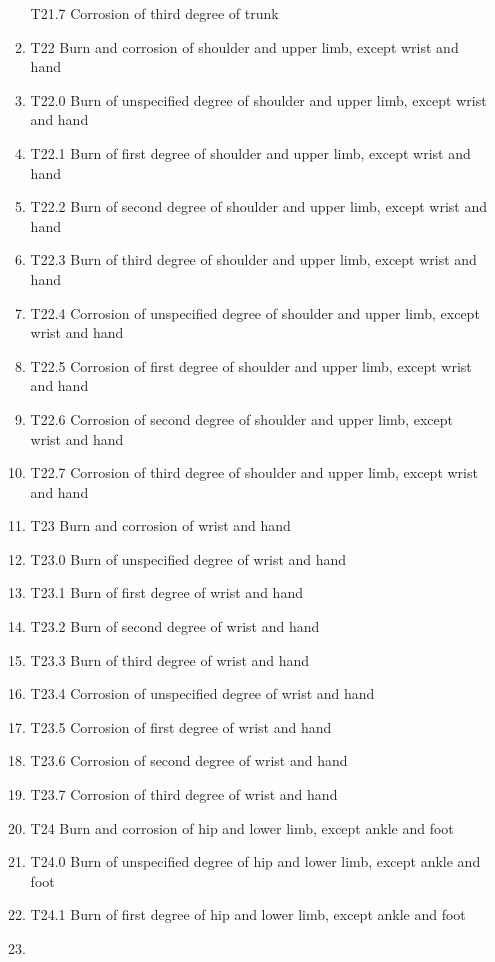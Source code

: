 \documentclass[
]{scrartcl}
\begin{document}
\begin{itemize}
\begin{enumerate}
    T21.7 Corrosion of third degree of trunk
  \item
    T22 Burn and corrosion of shoulder and upper limb, except wrist and
    hand
  \item
    T22.0 Burn of unspecified degree of shoulder and upper limb, except
    wrist and hand
  \item
    T22.1 Burn of first degree of shoulder and upper limb, except wrist
    and hand
  \item
    T22.2 Burn of second degree of shoulder and upper limb, except wrist
    and hand
  \item
    T22.3 Burn of third degree of shoulder and upper limb, except wrist
    and hand
  \item
    T22.4 Corrosion of unspecified degree of shoulder and upper limb,
    except wrist and hand
  \item
    T22.5 Corrosion of first degree of shoulder and upper limb, except
    wrist and hand
  \item
    T22.6 Corrosion of second degree of shoulder and upper limb, except
    wrist and hand
  \item
    T22.7 Corrosion of third degree of shoulder and upper limb, except
    wrist and hand
  \item
    T23 Burn and corrosion of wrist and hand
  \item
    T23.0 Burn of unspecified degree of wrist and hand
  \item
    T23.1 Burn of first degree of wrist and hand
  \item
    T23.2 Burn of second degree of wrist and hand
  \item
    T23.3 Burn of third degree of wrist and hand
  \item
    T23.4 Corrosion of unspecified degree of wrist and hand
  \item
    T23.5 Corrosion of first degree of wrist and hand
  \item
    T23.6 Corrosion of second degree of wrist and hand
  \item
    T23.7 Corrosion of third degree of wrist and hand
  \item
    T24 Burn and corrosion of hip and lower limb, except ankle and foot
  \item
    T24.0 Burn of unspecified degree of hip and lower limb, except ankle
    and foot
  \item
    T24.1 Burn of first degree of hip and lower limb, except ankle and
    foot
  \item

\end{enumerate}
\end{itemize}
\end{document}
